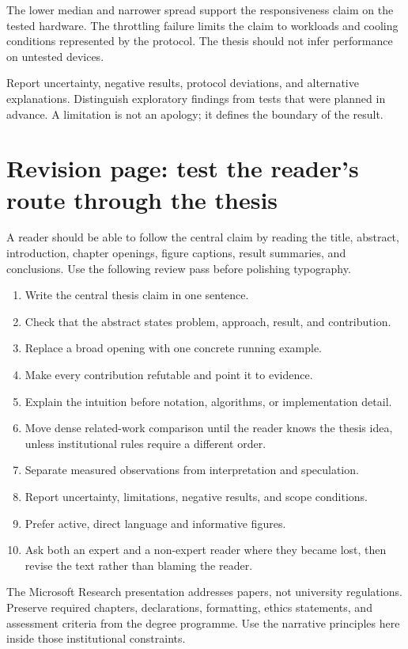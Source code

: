 \begin{keypoint}[Interpretation]
The lower median and narrower spread support the responsiveness claim on the
tested hardware. The throttling failure limits the claim to workloads and
cooling conditions represented by the protocol. The thesis should not infer
performance on untested devices.
\end{keypoint}

Report uncertainty, negative results, protocol deviations, and alternative
explanations. Distinguish exploratory findings from tests that were planned in
advance. A limitation is not an apology; it defines the boundary of the result.

\clearpage
\section{Revision page: test the reader's route through the thesis}
A reader should be able to follow the central claim by reading the title,
abstract, introduction, chapter openings, figure captions, result summaries,
and conclusions. Use the following review pass before polishing typography.

\begin{enumerate}
  \item Write the central thesis claim in one sentence.
  \item Check that the abstract states problem, approach, result, and contribution.
  \item Replace a broad opening with one concrete running example.
  \item Make every contribution refutable and point it to evidence.
  \item Explain the intuition before notation, algorithms, or implementation detail.
  \item Move dense related-work comparison until the reader knows the thesis idea,
        unless institutional rules require a different order.
  \item Separate measured observations from interpretation and speculation.
  \item Report uncertainty, limitations, negative results, and scope conditions.
  \item Prefer active, direct language and informative figures.
  \item Ask both an expert and a non-expert reader where they became lost, then
        revise the text rather than blaming the reader.
\end{enumerate}

\begin{keypoint}
The Microsoft Research presentation addresses papers, not university
regulations. Preserve required chapters, declarations, formatting, ethics
statements, and assessment criteria from the degree programme. Use the narrative
principles here inside those institutional constraints.
\end{keypoint}

